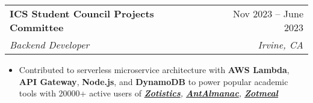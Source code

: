 \documentclass[letterpaper,11pt]{article}
\makeatletter
\newcommand{\resumeItem}[1]{
  \item\small{
    {#1 \vspace{-2pt}}
  }
}
\newcommand{\resumeSubheading}[4]{
  \vspace{-2pt}\item
    \begin{tabular*}{0.97\textwidth}[t]{l@{\extracolsep{\fill}}r}
      \textbf{#1} & #2 \\
      \textit{\small#3} & \textit{\small #4} \\
    \end{tabular*}\vspace{-7pt}
}
\newcommand{\resumeItemListStart}{\begin{itemize}}
\newcommand{\resumeItemListEnd}{\end{itemize}\vspace{-5pt}}
\makeatother
\begin{document}
    \resumeSubheading
      {ICS Student Council Projects Committee}{Nov 2023 -- June 2023}
      {Backend Developer}{Irvine, CA}
      \resumeItemListStart
          \resumeItem{Contributed to serverless microservice architecture with \textbf{AWS Lambda}, \textbf{API Gateway}, \textbf{Node.js}, and \textbf{DynamoDB} to power popular academic tools with 20000+ active users of \it{\textbf{\href{https://zotistics.com/}{Zotistics}}}, \it{\textbf{\href{https://antalmanac.com/}{AntAlmanac}}}, \it{\textbf{\href{https://apps.apple.com/us/app/zotmeal/id1551606266}{Zotmeal}}}}

      \resumeItemListEnd
      


      
      
\end{document}
